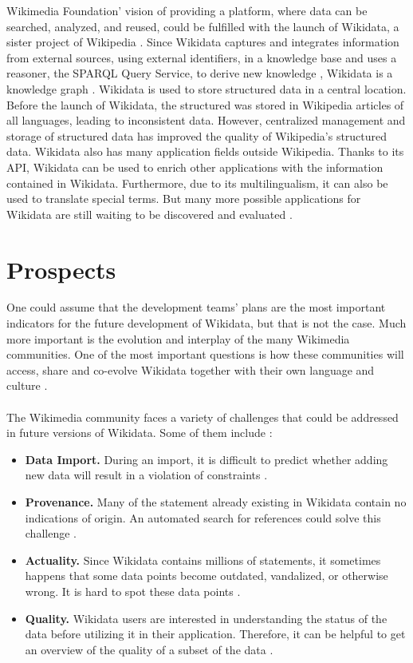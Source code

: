 ﻿\documentclass[11pt,titlepage,oneside,openany]{book}
\begin{document}
Wikimedia Foundation’ vision of providing a platform, where data can be searched, analyzed, and reused, could be fulfilled with the launch of Wikidata, a sister project of Wikipedia \cite{AFCK01}. Since Wikidata captures and integrates information from external sources, using external identifiers, in a knowledge base and uses a reasoner, the SPARQL Query Service,  to derive new knowledge \cite{Malyshev2018GettingTM}, Wikidata is a knowledge graph \cite{TDKG01}. Wikidata is used to store structured data in a central location. Before the launch of Wikidata, the structured was stored in  Wikipedia articles of all languages, leading to inconsistent data. However, centralized management and storage of structured data has improved the quality of Wikipedia's structured data. Wikidata also has many application fields outside Wikipedia. Thanks to its API, Wikidata can be used to enrich other applications with the information contained in Wikidata. Furthermore, due to its multilingualism, it can also be used to translate special terms. But many more possible applications for Wikidata are still waiting to be discovered and evaluated \cite{AFCK01}.


\section{Prospects}

One could assume that the development teams' plans are the most important indicators for the future development of Wikidata, but that is not the case. Much more important is the evolution and interplay of the many Wikimedia communities. One of the most important questions is how these communities will access, share and co-evolve Wikidata together with their own language and culture \cite{AFCK01}. 
\\
\\
The Wikimedia community faces a variety of challenges that could be addressed in future versions of Wikidata. Some of them include \cite{AFCK01}:
\begin{itemize}
	\item \textbf{Data Import. } During an import, it is difficult to predict whether adding new data will result in a violation of constraints \cite{AFCK01}.
	\item \textbf{Provenance. } Many of the statement already existing in Wikidata contain no indications of origin. An automated search for references could solve this challenge \cite{AFCK01}.
	\item \textbf{Actuality. } Since Wikidata contains millions of statements, it sometimes happens that some data points become outdated, vandalized, or otherwise wrong. It is hard to spot these data points \cite{AFCK01}.
	\item \textbf{Quality. } Wikidata users are interested in understanding the status of the data before utilizing it in their application. Therefore, it can be helpful to get an overview of the quality of a subset of the data \cite{AFCK01}.
\end{itemize}
\end{document}
